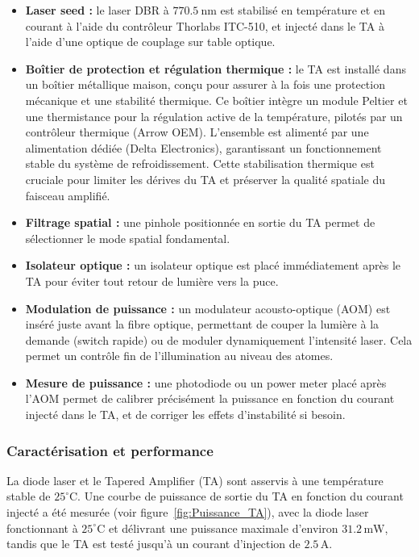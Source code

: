 \begin{itemize}[label=$\triangleright$]
    \item \textbf{Laser seed :} le laser DBR à $770.5~\text{nm}$ est stabilisé en température et en courant à l’aide du contrôleur Thorlabs ITC-510, et injecté dans le TA à l’aide d’une optique de couplage sur table optique.
    
    \item \textbf{Boîtier de protection et régulation thermique :} le TA est installé dans un boîtier métallique maison, conçu pour assurer à la fois une protection mécanique et une stabilité thermique. Ce boîtier intègre un module Peltier et une thermistance pour la régulation active de la température, pilotés par un contrôleur thermique (Arrow OEM). L’ensemble est alimenté par une alimentation dédiée (Delta Electronics), garantissant un fonctionnement stable du système de refroidissement. Cette stabilisation thermique est cruciale pour limiter les dérives du TA et préserver la qualité spatiale du faisceau amplifié.

    \item \textbf{Filtrage spatial :} une pinhole positionnée en sortie du TA permet de sélectionner le mode spatial fondamental.

    \item \textbf{Isolateur optique :} un isolateur optique est placé immédiatement après le TA pour éviter tout retour de lumière vers la puce.

    \item \textbf{Modulation de puissance :} un modulateur acousto-optique (AOM) est inséré juste avant la fibre optique, permettant de couper la lumière à la demande (switch rapide) ou de moduler dynamiquement l’intensité laser. Cela permet un contrôle fin de l’illumination au niveau des atomes.
    
    \item \textbf{Mesure de puissance :} une photodiode ou un power meter placé après l’AOM permet de calibrer précisément la puissance en fonction du courant injecté dans le TA, et de corriger les effets d’instabilité si besoin.
\end{itemize}

\subsubsection*{Caractérisation et performance}

La diode laser et le Tapered Amplifier (TA) sont asservis à une température stable de $25^\circ$C. Une courbe de puissance de sortie du TA en fonction du courant injecté a été mesurée (voir figure~\ref{fig:Puissance_TA}), avec la diode laser fonctionnant à $25^\circ$C et délivrant une puissance maximale d’environ $31.2\,\text{mW}$, tandis que le TA est testé jusqu’à un courant d’injection de $2.5\,\text{A}$.

